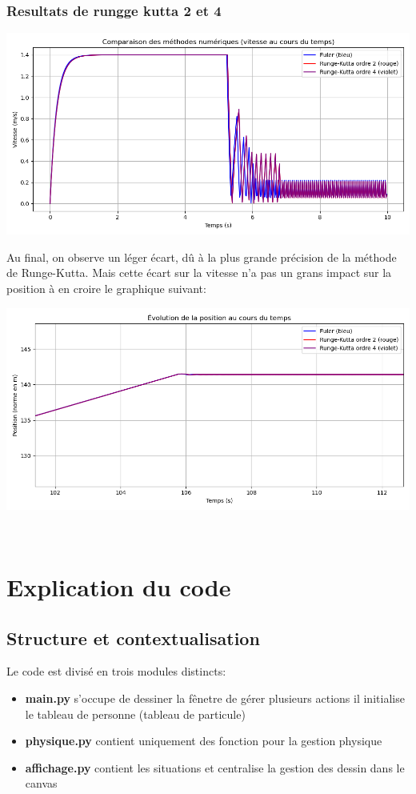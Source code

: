 \documentclass[a4paper,12pt]{article}
\begin{document}
\subsubsection{Resultats de rungge kutta 2 et 4}

\includegraphics[width=\textwidth]{runge.png}

Au final, on observe un léger écart, dû à la plus grande précision de la méthode de Runge-Kutta. Mais cette écart sur la vitesse n'a pas un grans impact sur la position à en croire le graphique suivant:

\includegraphics[width=\textwidth]{runge_pos.png}


\
\section{Explication du code}
\subsection{Structure et contextualisation}
\noindent Le code est divisé en trois modules distincts:
\begin{itemize}
	\item \textbf{main.py} s'occupe de dessiner la fênetre de gérer plusieurs actions il initialise le tableau de personne (tableau de particule)
	
	\item \textbf{physique.py} contient uniquement des fonction pour la gestion physique
	
	\item \textbf{affichage.py} contient les situations et centralise la gestion des dessin dans le canvas
\end{itemize}
\end{document}
